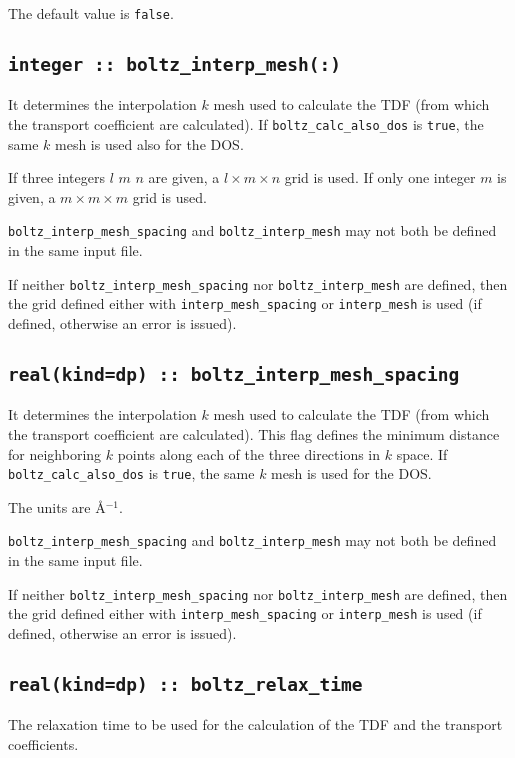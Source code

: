 The default value is \verb#false#.

\subsection[boltz\_interp\_mesh]{\tt integer :: boltz\_interp\_mesh(:)}
It determines the interpolation $k$ mesh used to calculate the TDF (from which the transport coefficient are calculated). If {\tt boltz\_calc\_also\_dos} is \verb#true#, the same $k$ mesh is used also for the DOS.

If three integers $l$ $m$ $n$ are given, a $l\times m\times n$ grid is used. If only one integer $m$ is given, a $m\times m\times m$ grid is used.

{\tt boltz\_interp\_mesh\_spacing} and  {\tt boltz\_interp\_mesh} may not both be defined in the same input file.

If neither {\tt boltz\_interp\_mesh\_spacing} nor  {\tt boltz\_interp\_mesh} are defined, then the grid defined either with {\tt interp\_mesh\_spacing} or {\tt interp\_mesh} is used (if defined, otherwise an error is issued).

\subsection[boltz\_interp\_mesh\_spacing]{\tt real(kind=dp) :: boltz\_interp\_mesh\_spacing}
It determines the interpolation $k$ mesh used to calculate the TDF (from which the transport coefficient are calculated). This flag defines the minimum distance for neighboring $k$ points along each of the three directions in $k$ space. If {\tt boltz\_calc\_also\_dos} is \verb#true#, the same $k$ mesh is used for the DOS.

The units are \AA$^{-1}$.

{\tt boltz\_interp\_mesh\_spacing} and  {\tt boltz\_interp\_mesh} may not both be defined in the same input file.

If neither {\tt boltz\_interp\_mesh\_spacing} nor  {\tt boltz\_interp\_mesh} are defined, then the grid defined either with {\tt interp\_mesh\_spacing} or {\tt interp\_mesh} is used (if defined, otherwise an error is issued).

\subsection[boltz\_relax\_time]{\tt real(kind=dp) :: boltz\_relax\_time}
The relaxation time to be used for the calculation of the TDF and the transport coefficients.

